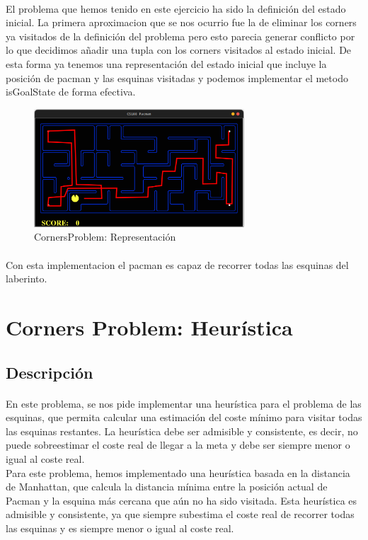 \documentclass{report}
\begin{document}
          \paragraph*{}{
            El problema que hemos tenido en este ejercicio ha sido la definición del estado inicial. La primera aproximacion que se nos ocurrio fue la de eliminar los corners ya visitados de la definición del problema pero esto parecia generar conflicto por lo que decidimos añadir una tupla con los corners visitados al estado inicial.
            De esta forma ya tenemos una representación del estado inicial que incluye la posición de pacman y las esquinas visitadas y podemos implementar el metodo isGoalState de forma efectiva.
            }
          \begin{figure}[H]
            \centering
            \includegraphics[width=0.7\textwidth]{.img/2.5-6.1.png}
            \caption{CornersProblem: Representación}
          \end{figure}
          \paragraph*{}{
            Con esta implementacion el pacman es capaz de recorrer todas las esquinas del laberinto.
          }
      \clearpage\section{Corners Problem: Heurística}
        \subsection*{Descripción}
          \paragraph*{}{
            En este problema, se nos pide implementar una heurística para el problema de las esquinas, que permita calcular una estimación del coste mínimo para visitar todas las esquinas restantes. La heurística debe ser admisible y consistente, es decir, no puede sobreestimar el coste real de llegar a la meta y debe ser siempre menor o igual al coste real.\\
            Para este problema, hemos implementado una heurística basada en la distancia de Manhattan, que calcula la distancia mínima entre la posición actual de Pacman y la esquina más cercana que aún no ha sido visitada. Esta heurística es admisible y consistente, ya que siempre subestima el coste real de recorrer todas las esquinas y es siempre menor o igual al coste real.\\
          }
\end{document}
